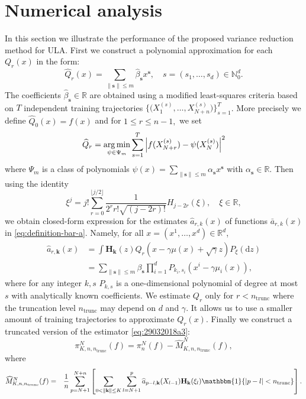 \documentclass[bj]{imsart}
\def\nset{\mathbb{N}}
\def\rmd{\mathrm{d}}
\newcommand*{\argmin}{\operatornamewithlimits{arg\,min}}
\begin{document}
\section{Numerical analysis}
\label{sec:num}
In this section we illustrate the performance of the proposed variance reduction method for ULA.
First we construct a polynomial approximation  for each \(Q_r(x)\)  in the form:
\begin{equation*}
\widehat{Q}_{r}(x) = \sum_{\|\mathbf{s}\|\leq m} \widehat\beta_{\mathbf{s}} x^{\mathbf{s}},\quad s=(s_1,\ldots,s_d) \in \nset_0^d.
\end{equation*}
The coefficients \(\widehat \beta_{\mathbf{s}}\in \mathbb{R}\) are obtained using a modified least-squares criteria based on $T$ independent training trajectories \(\bigl\{\bigl(X_1^{(s)},\ldots,X_{N+n}^{(s)}\bigr)\bigr\}_{s=1}^{T}\). More precisely  we define $\widehat{Q}_0(x) = f(x)$ and for \(1 \leq r \leq n-1,\) we set
\begin{eqnarray}
\label{eq:Qregr}
\widehat{Q}_r = \argmin_{\psi \in \Psi_m} \sum_{s = 1}^{T}  \left| f(X_{N+r}^{(s)}) - \psi(X_{N}^{(s)})\right|^2
\end{eqnarray}
 where $\Psi_m$ is a class of polynomials $ \psi(x) = \sum_{\|\mathbf{s}\|\leq m} \alpha_{\mathbf{s}} x^{\mathbf{s}}$ with $\alpha_{\mathbf{s}}\in \mathbb{R}$. Then using the identity
\[
\xi^j = j! \sum_{r = 0}^{\lfloor j/2 \rfloor} \frac{1}{2^r  r! \sqrt{(j-2r)!}} H_{j-2r}(\xi),\quad \xi \in \mathbb{R},
\]
we obtain closed-form expression for the estimates $\widehat a_{r,k}(x)$ of functions $\bar a_{r,k}(x)$ in \eqref{eq:definition-bar-a}. Namely, for all $x=(x^1,\dots,x^d) \in \mathbb{R}^d$,
\begin{align}
\nonumber
\widehat a_{r,\mathbf{k}} (x) &= \int \mathbf{H}_\mathbf{k}(z) \widehat{Q}_{r}(x - \gamma \mu(x) + \sqrt{\gamma}z) P_\xi(\rmd z)
\\
&=
\label{eq:a-pol}
\sum_{\|\mathbf{s}\|\leq m} \beta_{\mathbf{s}} \prod_{i=1}^d P_{k_i,s_i}(x^i - \gamma \mu_i(x)),
\end{align}
where for any integer $k,s$ $P_{k,s}$ is a one-dimensional polynomial of degree at most \(s\) with analytically known coefficients. We estimate $Q_{r}$ only for $r < n_{\mathrm{trunc}}$ where the truncation level \(n_{\mathrm{trunc}}\) may depend on \(d\) and \(\gamma.\) It allows us to use a smaller amount of training trajectories to approximate $Q_{r}(x)$.
Finally  we construct a truncated version of the estimator \eqref{eq:29032018a3}:
\[
\pi_{K,n,n_{\mathrm{trunc}}}^N(f) = \pi_n^N(f) -  \widehat M_{K,n, n_{\mathrm{trunc}}}^{N}(f),
\]
where
\begin{eqnarray*}
\widehat M_{K,n,n_{\mathrm{trunc}}}^N(f) &=&\frac{1}{n}\sum_{p=N+1}^{N+n}\left[\sum_{0 < \|\mathbf{k}\|\leq K}\sum_{l=N+1}^{p} \widehat a_{p-l,\mathbf{k}}(X_{l-1})\mathbf{H}_\mathbf{k}(\xi_{l})\mathbbm{1}\{ | p-l | < n_{\mathrm{trunc}}\}\right].
\end{eqnarray*}
\end{document}
